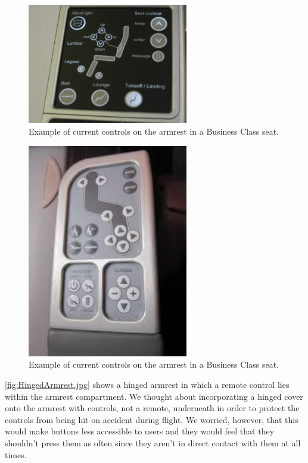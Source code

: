 \begin{figure}[h]
  \centering
     \includegraphics[width=7cm]{images/ArmrestControls1.jpg}
   \caption{Example of current controls on the armrest in a Business Class seat. \cite{armrest_controls1}}
  \label{fig:ArmrestsControls1.jpg}
\end{figure}

\begin{figure}[h]
  \centering
     \includegraphics[width=7cm]{images/ArmrestControls2.jpg}
   \caption{Example of current controls on the armrest in a Business Class seat. \cite{armrest_controls2}}
  \label{fig:ArmrestsControls2.jpg}
\end{figure}

\ref{fig:HingedArmrest.jpg} shows a hinged armrest in which a remote control lies within the armrest compartment.  We thought about incorporating a hinged cover onto the armrest with controls, not a remote, underneath in order to protect the controls from being hit on accident during flight. We worried, however, that this would make buttons less accessible to users and they would feel that they shouldn't press them as often since they aren't in direct contact with them at all times. 

